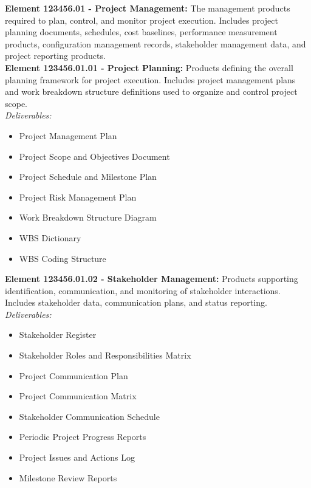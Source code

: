 \textbf{Element 123456.01 - Project Management:} The management products required to
plan, control, and monitor project execution. Includes project planning documents,
schedules, cost baselines, performance measurement products, configuration
management records, stakeholder management data, and project reporting
products.\\

\textbf{Element 123456.01.01 - Project Planning:} Products defining the overall planning
framework for project execution. Includes project management plans and work
breakdown structure definitions used to organize and control project scope.\\
\textit{Deliverables:}
\begin{itemize}
    \item Project Management Plan
    \item Project Scope and Objectives Document
    \item Project Schedule and Milestone Plan
    \item Project Risk Management Plan
    \item Work Breakdown Structure Diagram
    \item WBS Dictionary
    \item WBS Coding Structure
\end{itemize}

\textbf{Element 123456.01.02 - Stakeholder Management:} Products supporting
identification, communication, and monitoring of stakeholder interactions. Includes
stakeholder data, communication plans, and status reporting.\\
\textit{Deliverables:}
\begin{itemize}
    \item Stakeholder Register
    \item Stakeholder Roles and Responsibilities Matrix
    \item Project Communication Plan
    \item Project Communication Matrix
    \item Stakeholder Communication Schedule
    \item Periodic Project Progress Reports
    \item Project Issues and Actions Log
    \item Milestone Review Reports
\end{itemize}

